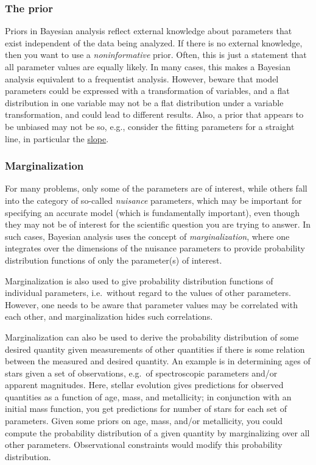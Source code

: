 \documentclass[12pt]{article}
\begin{document}
\subsubsection{The prior}
Priors in Bayesian analysis reflect external knowledge about
parameters that exist independent of the data being analyzed. If there
is no external knowledge, then you want to use a \emph{noninformative} prior.
Often, this is just a statement that all parameter values are equally
likely. In many cases, this makes a Bayesian analysis equivalent to a
frequentist analysis. However, beware that model parameters could be
expressed with a transformation of variables, and a flat distribution
in one variable may not be a flat distribution under a variable
transformation, and could lead to different results. Also, a prior
that appears to be unbiased may not be so, e.g., consider the fitting
parameters for a straight line, in particular the
\href{http://astronomy.nmsu.edu/holtz/a575/images/slope.png}
{slope}.

\subsubsection{Marginalization}

For many problems, only some of the parameters are of interest, while
others fall into the category of so-called \emph{nuisance} parameters, which
may be important for specifying an accurate model (which is
fundamentally important), even though they may not be of interest for
the scientific question you are trying to answer. In such cases,
Bayesian analysis uses the concept of \emph{marginalization}, where one
integrates over the dimensions of the nuisance parameters to provide
probability distribution functions of only the parameter(s) of
interest.

Marginalization is also used to give probability distribution
functions of individual parameters, i.e.\ without regard to the values
of other parameters. However, one needs to be aware that parameter
values may be correlated with each other, and marginalization hides
such correlations.

Marginalization can also be used to derive the probability
distribution of some desired quantity given measurements of other
quantities if there is some relation between the measured and desired
quantity. An example is in determining ages of stars given a set of
observations, e.g.\ of spectroscopic parameters and/or apparent
magnitudes. Here, stellar evolution gives predictions for observed
quantities as a function of age, mass, and metallicity; in conjunction
with an initial mass function, you get predictions for number of stars
for each set of parameters. Given some priors on age, mass, and/or
metallicity, you could compute the probability distribution of a given
quantity by marginalizing over all other parameters. Observational
constraints would modify this probability distribution.
\end{document}
